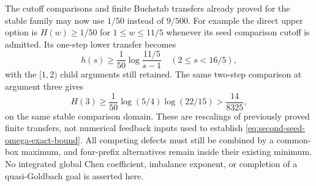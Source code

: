 The cutoff comparisons and finite Buchstab transfers already proved
for the stable family may now use $1/50$ instead of $9/500$.
For example the direct upper option is $H(w)\ge1/50$ for
$1\le w\le11/5$ whenever its seed comparison cutoff is admitted.
Its one-step lower transfer becomes
\[
 h(s)\ge\frac1{50}\log\frac{11/5}{s-1}
 \quad(2\le s<16/5),
\]
with the $[1,2)$ child arguments still retained.  The same two-step
comparison at argument three gives
\[
 H(3)\ge\frac1{50}\log(5/4)\log(22/15)
 >\frac{14}{8325},
\]
on the same stable comparison domain.  These are rescalings of
previously proved finite transfers, not numerical feedback inputs
used to establish \eqref{eq:second-seed-omega-exact-bound}.
All competing defects must still be combined by a common-box
maximum, and four-prefix alternatives remain inside their existing
minimum.  No integrated global Chen coefficient, imbalance
exponent, or completion of a quasi-Goldbach goal is asserted here.
